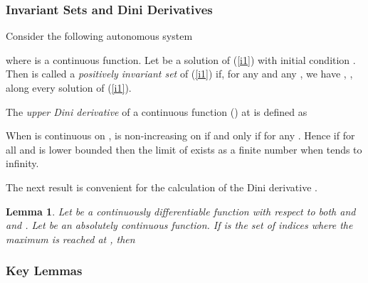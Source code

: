 \documentclass[a4paper, 11pt]{article}
\newtheorem{lemma}{Lemma}
\begin{document}
\subsubsection{Invariant Sets and Dini Derivatives}
Consider the following
autonomous system

where  is a  continuous function. Let  be a solution of
(\ref{i1}) with initial condition . Then  is called a {\it positively invariant
set} of (\ref{i1}) if, for any  and any ,
we have , , along  every solution  of (\ref{i1}).

The  {\it upper Dini
derivative} of a continuous function  () at  is defined as

When  is continuous on ,  is
non-increasing on  if and only if  for any
. Hence if  for all  and  is lower bounded then the limit of  exists as a finite number when  tends to infinity.

The next
result is convenient for the calculation of the Dini derivative \cite{dan}.

\begin{lemma}
\label{lemdini}  Let  be
 a continuously differentiable  function with respect to both  and   and . Let  be an absolutely continuous function. If 
is the set of indices where the maximum is reached at , then

\end{lemma}


\subsubsection{Key Lemmas}
\end{document}
